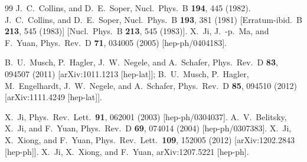 \documentclass[aps,prd,preprint,tightenlines,superscriptaddress]{revtex4}
\begin{document}
\begin{thebibliography}{99}
  J.~C.~Collins, and D.~E.~Soper,
  Nucl.\ Phys.\ B {\bf 194}, 445 (1982).
  J.~C.~Collins, and D.~E.~Soper,
  Nucl.\ Phys.\ B {\bf 193}, 381 (1981)
  [Erratum-ibid.\ B {\bf 213}, 545 (1983)]
  [Nucl.\ Phys.\ B {\bf 213}, 545 (1983)].
  X.~Ji, J.~-p.~Ma, and F.~Yuan,
  Phys.\ Rev.\ D {\bf 71}, 034005 (2005)
  [hep-ph/0404183].


  B.~U.~Musch, P.~Hagler, J.~W.~Negele, and A.~Schafer,
  Phys.\ Rev.\ D {\bf 83}, 094507 (2011)
  [arXiv:1011.1213 [hep-lat]];
  B.~U.~Musch, P.~Hagler, M.~Engelhardt, J.~W.~Negele, and A.~Schafer,
  Phys.\ Rev.\ D {\bf 85}, 094510 (2012)
  [arXiv:1111.4249 [hep-lat]].

  X.~Ji,
  Phys.\ Rev.\ Lett.\  {\bf 91}, 062001 (2003)
  [hep-ph/0304037].
  A.~V.~Belitsky, X.~Ji, and F.~Yuan,
  Phys.\ Rev.\ D {\bf 69}, 074014 (2004)
  [hep-ph/0307383].
  X.~Ji, X.~Xiong, and F.~Yuan,
  Phys.\ Rev.\ Lett.\  {\bf 109}, 152005 (2012)
  [arXiv:1202.2843 [hep-ph]].
  X.~Ji, X.~Xiong, and F.~Yuan,
  arXiv:1207.5221 [hep-ph].


\end{thebibliography}
\end{document}
